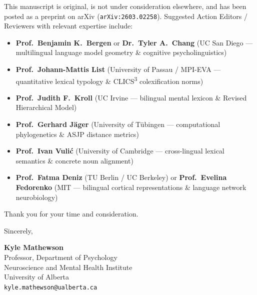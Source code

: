 \documentclass[11pt,a4paper]{article}
\begin{document}
This manuscript is original, is not under consideration elsewhere, and has been posted as a preprint on arXiv (\texttt{arXiv:2603.02258}). Suggested Action Editors / Reviewers with relevant expertise include:
\begin{itemize}
  \item \textbf{Prof.\ Benjamin K.\ Bergen} or \textbf{Dr.\ Tyler A.\ Chang} (UC San Diego --- multilingual language model geometry \& cognitive psycholinguistics)
  \item \textbf{Prof.\ Johann-Mattis List} (University of Passau / MPI-EVA --- quantitative lexical typology \& CLICS\textsuperscript{3} colexification norms)
  \item \textbf{Prof.\ Judith F.\ Kroll} (UC Irvine --- bilingual mental lexicon \& Revised Hierarchical Model)
  \item \textbf{Prof.\ Gerhard J\"ager} (University of T\"ubingen --- computational phylogenetics \& ASJP distance metrics)
  \item \textbf{Prof.\ Ivan Vuli\'c} (University of Cambridge --- cross-lingual lexical semantics \& concrete noun alignment)
  \item \textbf{Prof.\ Fatma Deniz} (TU Berlin / UC Berkeley) or \textbf{Prof.\ Evelina Fedorenko} (MIT --- bilingual cortical representations \& language network neurobiology)
\end{itemize}

Thank you for your time and consideration.

Sincerely,

\textbf{Kyle Mathewson} \\
Professor, Department of Psychology \\
Neuroscience and Mental Health Institute \\
University of Alberta \\
\texttt{kyle.mathewson@ualberta.ca}
\end{document}
